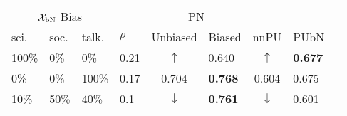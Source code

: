 \begin{tabular}{@{}lllllllll@{}}
  \toprule
  \multicolumn{3}{c}{$\mathcal{X}_{\textnormal{bN}}$ Bias} &    & \multicolumn{2}{c}{PN} &       &      \\\cmidrule{1-3}\cmidrule{5-6}
  sci.   & soc.   & talk.       & $\rho$   & Unbiased                          & Biased          & nnPU                             & PUbN \\\midrule
  100\%  & 0\%    & 0\%         & 0.21     & \multicolumn{1}{c}{$\uparrow$}    & 0.640           & \multicolumn{1}{c}{$\uparrow$}   & \textbf{0.677}\\
  0\%    & 0\%    & 100\%       & 0.17     & \multicolumn{1}{c}{0.704}         & \textbf{0.768}  & \multicolumn{1}{c}{0.604}        & 0.675 \\
  10\%   & 50\%   & 40\%        & 0.1      & \multicolumn{1}{c}{$\downarrow$}  & \textbf{0.761}  & \multicolumn{1}{c}{$\downarrow$} & 0.601 \\
  \bottomrule
\end{tabular}
